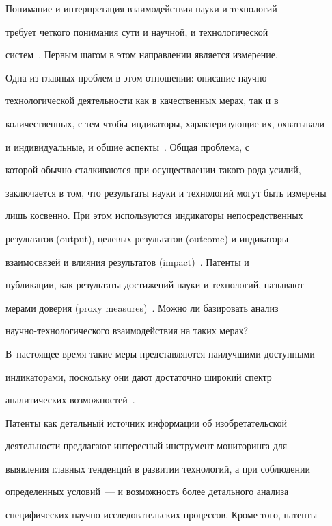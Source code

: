      


     Понимание и интерпретация взаимодействия науки и технологий 


требует четкого понимания сути и научной, и технологической 


систем~\cite{2-koz}. Первым шагом в этом направлении является измерение. 


Одна из главных проблем в этом отношении: описание научно-


технологической деятельности как в качественных мерах, так и в 


количественных, с тем чтобы индикаторы, характеризующие их, охватывали 


и индивидуальные, и общие аспекты~\cite{2-koz}. Общая проблема, с 


которой обычно сталкиваются при осуществлении такого рода усилий, 


заключается в том, что результаты науки и технологий могут быть измерены 


лишь косвенно. При этом используются индикаторы непосредственных 


результатов (output), целевых результатов (outcome) и индикаторы 


взаимосвязей и влияния результатов (impact)~\cite{2-koz, 10-koz}. Патенты и 


публикации, как результаты достижений науки и технологий, называют 


мерами доверия (proxy measures)~\cite{2-koz}. Можно ли базировать анализ 


     научно-технологического взаимодействия на таких мерах? 


В~настоящее время такие меры представляются наилучшими доступными 


индикаторами, поскольку они дают достаточно широкий спектр 


аналитических возможностей~\cite{11-koz}.


     


     Патенты как детальный источник информации об изобретательской 


деятельности предлагают интересный инструмент мониторинга для 


выявления главных тенденций в развитии технологий, а при соблюдении 


определенных условий~--- и возможность более детального анализа 


специфических научно-исследовательских процессов. Кроме того, патенты 


